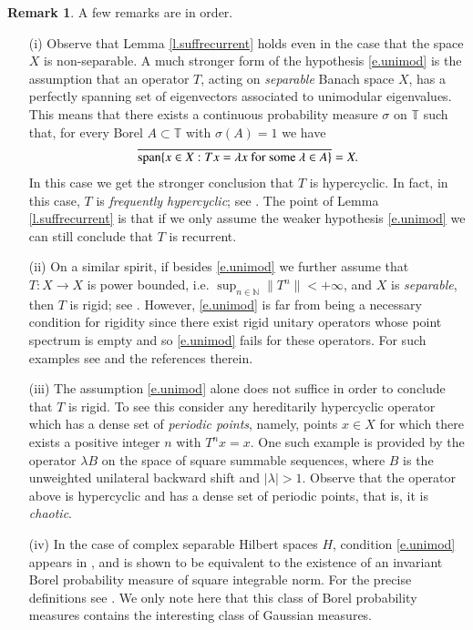 \documentclass[12pt,leqno]{amsart}
\theoremstyle{plain}
\theoremstyle{definition}
\newtheorem{remark}[equation]{Remark}
\numberwithin{equation}{section}
\begin{document}
\begin{remark}A few remarks are in order.
 
\begin{itemize}
  \item [(i)] Observe that Lemma \ref{l.suffrecurrent} holds even in the case that the space $X$ is non-separable. A much stronger form of the hypothesis \eqref{e.unimod} is the assumption that an operator $T$, acting on \emph{separable} Banach space $X$, has a perfectly spanning set of eigenvectors associated to unimodular eigenvalues. This means that there exists a continuous probability measure $\sigma$ on $\mathbb T$ such that, for every Borel $A\subset \mathbb T$ with $\sigma(A)=1$ we have 
\begin{align*}
	\overline{ \textnormal{span} \{ x\in X:Tx=\lambda x \ \text{for some}\ \lambda \in A \}}=X. 
\end{align*}
In this case we get the stronger conclusion that $T$ is hypercyclic. In fact, in this case, $T$ is \emph{frequently hypercyclic}; see \cites{Griv,Griv1,BaGr2,BaGr3}. The point of Lemma \ref{l.suffrecurrent} is that if we only assume the weaker hypothesis \eqref{e.unimod} we can still conclude that $T$ is recurrent.

\item[(ii)] On a similar spirit, if besides \eqref{e.unimod} we further assume that $T:X\to X$ is power bounded, i.e. $\sup_{n\in\mathbb N}\|T^n\|<+\infty$, and $X$ is \emph{separable}, then $T$ is rigid; see \cite{EIS}. However, \eqref{e.unimod} is far from being a necessary condition for rigidity since there exist rigid unitary operators whose point spectrum is empty and so \eqref{e.unimod} fails for these operators. For such examples see \cite{EIS} and the references therein.

\item[(iii)] The assumption \eqref{e.unimod} alone does not suffice in order to conclude that $T$ is rigid. To see this consider any hereditarily hypercyclic operator which has a dense set of \emph{periodic points}, namely, points $x\in X$ for which there exists a positive integer $n$ with $T^nx=x$. One such example is provided by the operator $\lambda B$ on the space of square summable sequences, where $B$ is the unweighted unilateral backward shift and $|\lambda|>1$. Observe that the operator above is hypercyclic and has a dense set of periodic points, that is, it is \emph{chaotic}.

\item[(iv)] In the case of complex separable Hilbert spaces $H$, condition \eqref{e.unimod} appears in \cite{Flytz}, and is shown to be equivalent to the existence of an invariant Borel probability measure of square integrable norm. For the precise definitions see \cite{Flytz}. We only note here that this class of Borel probability measures contains the interesting class of Gaussian measures.   
\end{itemize}
\end{remark}
  
\end{document}
